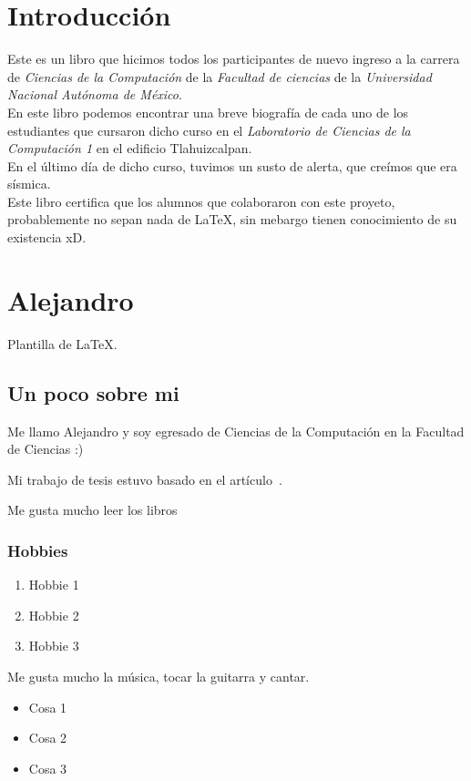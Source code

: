 \documentclass[oneside]{book}
\theoremstyle{definition}
\begin{document}
\chapter*{Introducción}
Este es un libro que hicimos todos los participantes de nuevo ingreso a la carrera
de \emph{Ciencias de la Computación} de la \emph{Facultad de ciencias} de la
\emph{Universidad Nacional Autónoma de México}.\\

En este libro podemos encontrar una breve biografía de cada uno de los estudiantes que cursaron
dicho curso en el \emph{Laboratorio de Ciencias de la Computación 1} en el edificio Tlahuizcalpan.\\

En el último día de dicho curso, tuvimos un susto de alerta, que creímos que era sísmica.\\

Este libro certifica que los alumnos que colaboraron con este proyeto, probablemente no sepan
nada de \LaTeX, sin mebargo tienen conocimiento de su existencia xD.

\chapter{Alejandro}

Plantilla de \large{\LaTeX.}
\section{Un poco sobre mi}
Me llamo Alejandro y soy egresado de Ciencias de la Computación en la Facultad de Ciencias :)

Mi trabajo de tesis estuvo basado en el artículo~\cite{Floodlight}.

Me gusta mucho leer los libros~\cite{torres,comunidad,retorno}

\subsection{Hobbies}
\begin{enumerate}
\item Hobbie 1
\item Hobbie 2
\item Hobbie 3
\end{enumerate}
Me gusta mucho la música, tocar la guitarra y cantar.

\begin{itemize}
\item Cosa 1
\item Cosa 2
\item Cosa 3
\end{itemize}
\end{document}
